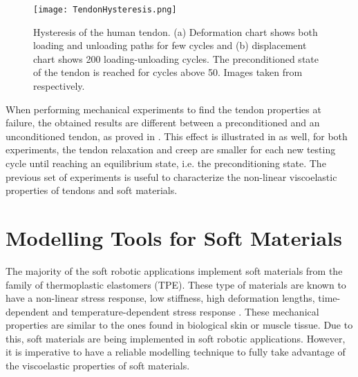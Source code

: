 \begin{figure}[htb!]
	\centering
	\texttt{[image: TendonHysteresis.png]}
	\caption[Hysteresis of the human tendon. (a) Deformation chart shows both loading and unloading paths for few cycles and (b) displacement chart shows 200 loading-unloading cycles. The preconditioned state of the tendon is reached for cycles above 50.]{Hysteresis of the human tendon. (a) Deformation chart shows both loading and unloading paths for few cycles and (b) displacement chart shows 200 loading-unloading cycles. The preconditioned state of the tendon is reached for cycles above 50. Images taken from \cite{maurel1998biomechanical,schatzmann1998effect} respectively. }
	\label{fig:tendonHysteresis}
\end{figure}

When performing mechanical experiments to find the tendon properties at failure, the obtained results are different between a preconditioned and an unconditioned tendon, as proved in \cite{schatzmann1998effect}. This effect is illustrated in  as well, for both experiments, the tendon relaxation and creep are smaller for each new testing cycle until reaching an equilibrium state, i.e. the preconditioning state. The previous set of experiments is useful to characterize the non-linear viscoelastic properties of tendons and soft materials. 

\section{Modelling Tools for Soft Materials } \label{sec:modelingTechniques}

The majority of the soft robotic applications implement soft materials from the family of thermoplastic elastomers (TPE). These type of materials are known to have a non-linear stress response, low stiffness, high deformation lengths, time-dependent and temperature-dependent stress response \cite{Bauman2008}. These mechanical properties are similar to the ones found in biological skin or muscle tissue. Due to this, soft materials are being implemented in soft robotic applications. However, it is imperative to have a reliable modelling technique to fully take advantage of the viscoelastic properties of soft materials.

